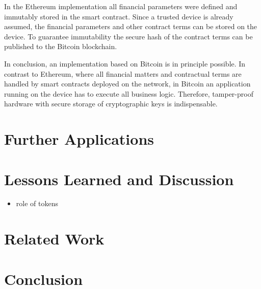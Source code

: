 In the Ethereum implementation all financial parameters were defined and immutably stored in the smart contract. Since a trusted device is already assumed, the financial parameters and other contract terms can be stored on the device. To guarantee immutability the secure hash of the contract terms can be published to the Bitcoin blockchain. 

In conclusion, an implementation based on Bitcoin is in principle possible. In contrast to Ethereum, where all financial matters and contractual terms are handled by smart contracts deployed on the network, in Bitcoin an application running on the device has to execute all business logic. Therefore, tamper-proof hardware with secure storage of cryptographic keys is indispensable.



\section{Further Applications}




\section{Lessons Learned and Discussion}




\begin{itemize}
\item role of tokens

\end{itemize}





\section{Related Work}


\section{Conclusion}

